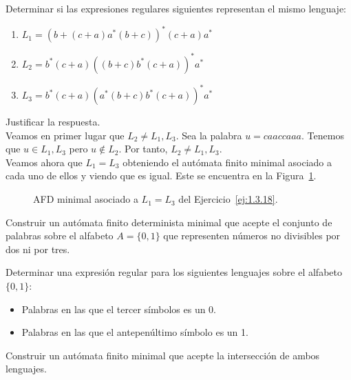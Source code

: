 \begin{ejercicio}\label{ej:1.3.18}
    Determinar si las expresiones regulares siguientes representan el mismo lenguaje:
    \begin{enumerate}
        \item $L_1={(b+(c+a)a^\ast (b+c))}^{\ast} (c+a)a^\ast$
        \item $L_2=b^\ast (c+a) {((b+c)b^\ast (c+a))}^{\ast}a^\ast$
        \item $L_3=b^\ast (c+a){(a^\ast (b+c)b^\ast (c+a))}^{\ast}a^\ast$
    \end{enumerate}
    Justificar la respuesta.\\

    Veamos en primer lugar que $L_2\neq L_1,L_3$. Sea la palabra $u=caaccaaa$.
    Tenemos que $u\in L_1, L_3$ pero $u\notin L_2$. Por tanto, $L_2\neq L_1, L_3$.\\

    Veamos ahora que $L_1=L_3$ obteniendo el autómata finito minimal asociado a cada uno de ellos y viendo que es igual. Este se encuentra en la Figura~\ref{fig:1.3.18-L1-L3}.
    \begin{figure}
        \centering
        \caption{AFD minimal asociado a $L_1=L_3$ del Ejercicio~\ref{ej:1.3.18}.}
        \label{fig:1.3.18-L1-L3}
    \end{figure}
\end{ejercicio}

\begin{ejercicio}\label{ej:1.3.19}
    Construir un autómata finito determinista minimal que acepte el conjunto de palabras sobre el alfabeto $A=\{0,1\}$ que representen números no divisibles por dos ni por tres.
\end{ejercicio}

\begin{ejercicio}\label{ej:1.3.20}
    Determinar una expresión regular para los siguientes lenguajes sobre el alfabeto $\{0,1\}$:
    \begin{itemize}
        \item Palabras en las que el tercer símbolos es un 0.
        \item Palabras en las que el antepenúltimo símbolo es un 1.
    \end{itemize}
    Construir un autómata finito minimal que acepte la intersección de ambos lenguajes.
\end{ejercicio}

